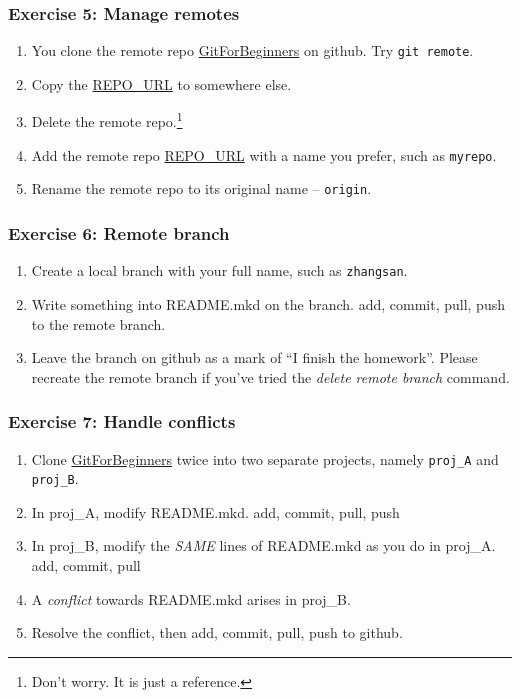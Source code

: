 \documentclass[11pt,ignorenonframetext,]{beamer}
\begin{document}
\begin{frame}[fragile]\frametitle{Exercise 5: Manage remotes}

\begin{enumerate}[1.]
\item
  You clone the remote repo
  \href{https://github.com/weijianwen/GitForBeginners}{GitForBeginners}
  on github. Try \texttt{git remote}.
\item
  Copy the
  \href{git@github.com:weijianwen/GitForBeginners.git}{REPO\_URL} to
  somewhere else.
\item
  Delete the remote repo.\footnote{Don't worry. It is just a reference.}
\item
  Add the remote repo
  \href{git@github.com:weijianwen/GitForBeginners.git}{REPO\_URL} with a
  name you prefer, such as \texttt{myrepo}.
\item
  Rename the remote repo to its original name -- \texttt{origin}.
\end{enumerate}
\end{frame}

\begin{frame}[fragile]\frametitle{Exercise 6: Remote branch}

\begin{enumerate}[1.]
\item
  Create a local branch with your full name, such as \texttt{zhangsan}.
\item
  Write something into README.mkd on the branch. add, commit, pull, push
  to the remote branch.
\item
  Leave the branch on github as a mark of ``I finish the homework''.
  Please recreate the remote branch if you've tried the \emph{delete
  remote branch} command.
\end{enumerate}
\end{frame}

\begin{frame}[fragile]\frametitle{Exercise 7: Handle conflicts}

\begin{enumerate}[1.]
\item
  Clone
  \href{https://github.com/weijianwen/GitForBeginners}{GitForBeginners}
  twice into two separate projects, namely \texttt{proj\_A} and
  \texttt{proj\_B}.
\item
  In proj\_A, modify README.mkd. add, commit, pull, push
\item
  In proj\_B, modify the \emph{SAME} lines of README.mkd as you do in
  proj\_A. add, commit, pull
\item
  A \emph{conflict} towards README.mkd arises in proj\_B.
\item
  Resolve the conflict, then add, commit, pull, push to github.
\end{enumerate}
\end{frame}
\end{document}
